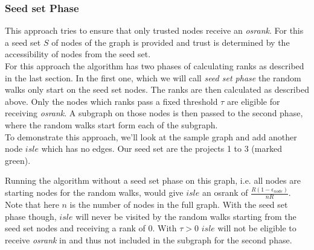 \documentclass{article}
\begin{document}
\subsubsection{Seed set Phase}
This approach tries to ensure that only trusted nodes receive an \textit{osrank}. For this
a seed set $S$ of nodes of the graph is provided and trust is determined by the
accessibility of nodes from the seed set.\\
For this approach the algorithm has two phases of calculating ranks as described in
the last section. In the first one, which we will call
\textit{seed set phase} the random walks only start on the seed set nodes. The
ranks are then calculated as described above. Only the nodes which ranks pass a
fixed threshold $\tau$ are eligible for receiving \textit{osrank}. A subgraph on those nodes
is then passed to the second phase, where the random walks start form each of
the subgraph.\\
To demonstrate this approach, we'll look at the sample graph and add another node $isle$
which has no edges. Our seed set are the projects 1 to 3 (marked green).

\begin{center}
\end{center}
Running the algorithm without a seed set phase on this graph, i.e. all nodes are
starting nodes for the random walks, would give $isle$ an
osrank of $\frac{R (1-\epsilon_{node})}{n R}$. Note that here $n$ is the number
of nodes in the full graph. With the seed set phase though, $isle$
will never be visited by the random walks starting from the seed set nodes and receiving a rank of 0.
With $\tau > 0$ $isle$ will not be eligible to receive \textit{osrank} in and thus not included
in the subgraph for the second phase.
\end{document}

